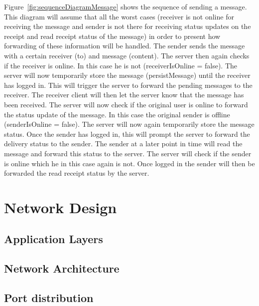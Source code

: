 Figure~\ref{fig:sequenceDiagramMessage} shows the sequence of sending a message. This diagram will assume that all the worst cases (receiver is not online for receiving the message and sender is not there for receiving status updates on the receipt and read receipt status of the message) in order to present how forwarding of these information will be handled. The sender sends the message with a certain receiver (to) and message (content). The server then again checks if the receiver is online. In this case he is not (receiverIsOnline = false). The server will now temporarily store the message (persistMessage) until the receiver has logged in. This will trigger the server to forward the pending messages to the receiver. The receiver client will then let the server know that the message has been received. The server will now check if the original user is online to forward the status update of the message. In this case the original sender is offline (senderIsOnline = false). The server will now again temporarily store the message status. Once the sender has logged in, this will prompt the server to forward the delivery status to the sender. 
The sender at a later point in time will read the message and forward this status to the server. The server will check if the sender is online which he in this case again is not. Once logged in the sender will then be forwarded the read receipt status by the server. 

\section{Network Design}\label{sec:network-design}

\subsection{Application Layers}\label{subsec:application-layers}

\subsection{Network Architecture}\label{subsec:network-architecture}

\subsection{Port distribution}\label{subsec:port-distribution}

